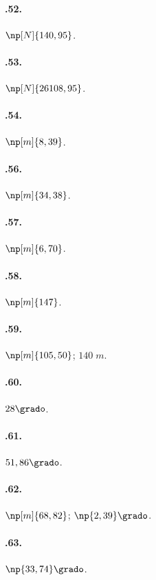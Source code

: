 \begin{multicols}{3}
\paragraph{\thechapter.52.}$\np[N]{140,95}$.

\paragraph{\thechapter.53.}$\np[N]{26108,95}$.

\paragraph{\thechapter.54.}$\np[m]{8,39}$.

\paragraph{\thechapter.56.}$\np[m]{34,38}$.

\paragraph{\thechapter.57.}$\np[m]{6,70}$.

\paragraph{\thechapter.58.}$\np[m]{147}$.

\paragraph{\thechapter.59.}$\np[m]{105,50}$; $140\;\unit{m}$.

\paragraph{\thechapter.60.}$28\grado$.

\paragraph{\thechapter.61.}$51,86\grado$.

\paragraph{\thechapter.62.}$\np[m]{68,82}$; $\np{2,39}\grado$.

\paragraph{\thechapter.63.}$\np{33,74}\grado$.


\end{multicols}
